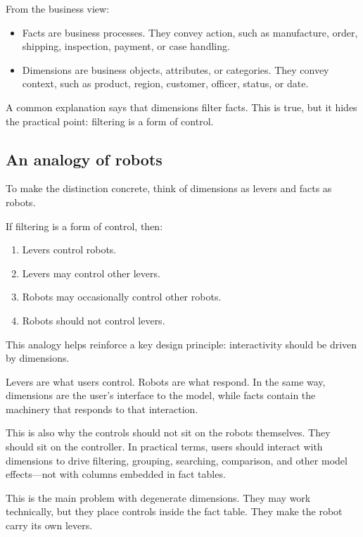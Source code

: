 \documentclass[10pt,openany,10pt]{book}
\providecommand{\tightlist}{%
  \setlength{\itemsep}{0pt}\setlength{\parskip}{0pt}}
\begin{document}
From the business view:

\begin{itemize}
\tightlist
\item
  Facts are business processes. They convey action, such as manufacture,
  order, shipping, inspection, payment, or case handling.
\item
  Dimensions are business objects, attributes, or categories. They
  convey context, such as product, region, customer, officer, status, or
  date.
\end{itemize}

A common explanation says that dimensions filter facts. This is true,
but it hides the practical point: filtering is a form of control.

\subsection{An analogy of robots}\label{an-analogy-of-robots}

To make the distinction concrete, think of dimensions as levers and
facts as robots.

If filtering is a form of control, then:

\begin{enumerate}
\def\labelenumi{\arabic{enumi}.}
\tightlist
\item
  Levers control robots.
\item
  Levers may control other levers.
\item
  Robots may occasionally control other robots.
\item
  Robots should not control levers.
\end{enumerate}

This analogy helps reinforce a key design principle: interactivity
should be driven by dimensions.

Levers are what users control. Robots are what respond. In the same way,
dimensions are the user's interface to the model, while facts contain
the machinery that responds to that interaction.

This is also why the controls should not sit on the robots themselves.
They should sit on the controller. In practical terms, users should
interact with dimensions to drive filtering, grouping, searching,
comparison, and other model effects---not with columns embedded in fact
tables.

This is the main problem with degenerate dimensions. They may work
technically, but they place controls inside the fact table. They make
the robot carry its own levers.
\end{document}
